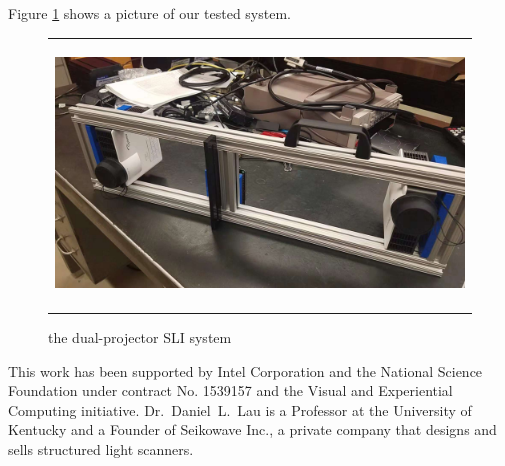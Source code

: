 \documentclass[]{spie}  %
\begin{document}
Figure \ref{Fig:3} shows a picture of our tested system.

\begin{figure}
   \begin{center}
   \begin{tabular}{c}
   \includegraphics[height=7cm]{dpphoto.jpg}
   \end{tabular}
   \end{center}
   \caption{the dual-projector SLI system}
   \label{Fig:3}
   \end{figure} 


\acknowledgments
This work has been supported by Intel Corporation and the National Science Foundation under contract No. 1539157 and the Visual and Experiential Computing initiative. Dr.~Daniel~L.~Lau is a Professor at the University of Kentucky and a Founder of Seikowave Inc., a private company that designs and sells structured light scanners.

\end{document}
